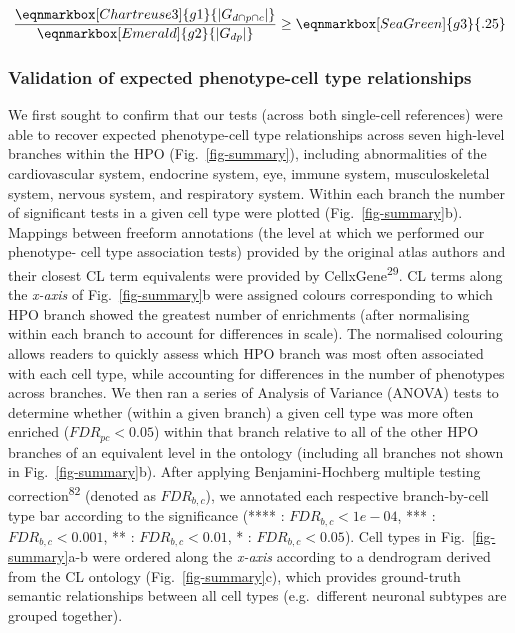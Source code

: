 \documentclass[
]{agujournal2019}
\begin{document}
\hfill\break

\begin{equation*}
  \frac{
     \eqnmarkbox[Chartreuse3]{g1}{|G_{d \cap p \cap c} |}
    }{
       \eqnmarkbox[Emerald]{g2}{|G_{dp}|}} 
  \geq \eqnmarkbox[SeaGreen]{g3}{.25} 
\end{equation*}

\hfill\break

\subsubsection{Validation of expected phenotype-cell type
relationships}\label{validation-of-expected-phenotype-cell-type-relationships-1}

We first sought to confirm that our tests (across both single-cell
references) were able to recover expected phenotype-cell type
relationships across seven high-level branches within the HPO
(Fig.~\ref{fig-summary}), including abnormalities of the cardiovascular
system, endocrine system, eye, immune system, musculoskeletal system,
nervous system, and respiratory system. Within each branch the number of
significant tests in a given cell type were plotted
(Fig.~\ref{fig-summary}b). Mappings between freeform annotations (the
level at which we performed our phenotype- cell type association tests)
provided by the original atlas authors and their closest CL term
equivalents were provided by CellxGene\textsuperscript{29}. CL terms
along the \emph{x-axis} of Fig.~\ref{fig-summary}b were assigned colours
corresponding to which HPO branch showed the greatest number of
enrichments (after normalising within each branch to account for
differences in scale). The normalised colouring allows readers to
quickly assess which HPO branch was most often associated with each cell
type, while accounting for differences in the number of phenotypes
across branches. We then ran a series of Analysis of Variance (ANOVA)
tests to determine whether (within a given branch) a given cell type was
more often enriched (\(FDR_{pc}<0.05\)) within that branch relative to
all of the other HPO branches of an equivalent level in the ontology
(including all branches not shown in Fig.~\ref{fig-summary}b). After
applying Benjamini-Hochberg multiple testing
correction\textsuperscript{82} (denoted as \(FDR _{b,c}\)), we annotated
each respective branch-by-cell type bar according to the significance
(**** : \(FDR _{b,c}<1e-04\), *** : \(FDR _{b,c}<0.001\), ** :
\(FDR _{b,c}<0.01\), * : \(FDR _{b,c}<0.05\)). Cell types in
Fig.~\ref{fig-summary}a-b were ordered along the \emph{x-axis} according
to a dendrogram derived from the CL ontology (Fig.~\ref{fig-summary}c),
which provides ground-truth semantic relationships between all cell
types (e.g.~different neuronal subtypes are grouped together).
\end{document}
